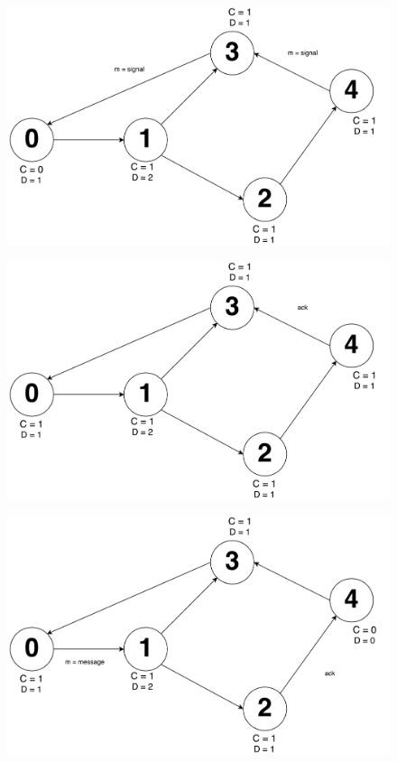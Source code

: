 \documentclass[times]{article}
\begin{document}
		\begin{figure}[H]
			\includegraphics[width=\linewidth]{q2/4.pdf}
		\end{figure}
		\begin{figure}[H]
			\includegraphics[width=\linewidth]{q2/5.pdf}
		\end{figure}
		\begin{figure}[H]
			\includegraphics[width=\linewidth]{q2/6.pdf}
		\end{figure}
\end{document}
